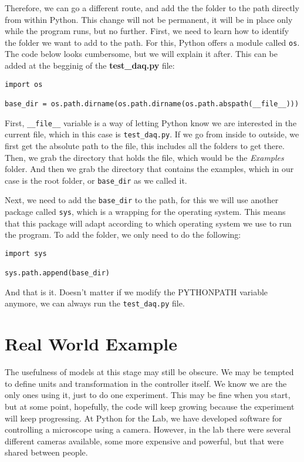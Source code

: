 Therefore, we can go a different route, and add the the folder to the path directly from within Python. This change will not be permanent, it will be in place only while the program runs, but no further. First, we need to learn how to identify the folder we want to add to the path. For this, Python offers a module called \texttt{os}. The code below looks cumbersome, but we will explain it after. This can be added at the begginig of the \textbf{test\_daq.py} file:

\begin{verbatim}
import os

base_dir = os.path.dirname(os.path.dirname(os.path.abspath(__file__)))
\end{verbatim}

First, \texttt{\_\_file\_\_} variable is a way of letting Python know we are interested in the current file, which in this case is \texttt{test\_daq.py}. If we go from inside to outside, we first get the absolute path to the file, this includes all the folders to get there. Then, we grab the directory that holds the file, which would be the \emph{Examples} folder. And then we grab the directory that contains the examples, which in our case is the root folder, or \texttt{base\_dir} as we called it.

Next, we need to add the \texttt{base\_dir} to the path, for this we will use another package called \texttt{sys}, which is a wrapping for the operating system. This means that this package will adapt according to which operating system we use to run the program. To add the folder, we only need to do the following:

\begin{verbatim}
import sys

sys.path.append(base_dir)
\end{verbatim}

And that is it. Doesn't matter if we modify the PYTHONPATH variable anymore, we can always run the \texttt{test\_daq.py} file.


\section{Real World Example}\label{section:real-world-model}
The usefulness of models at this stage may still be obscure. We may be tempted to define units and transformation in the controller itself. We know we are the only ones using it, just to do one experiment. This may be fine when you start, but at some point, hopefully, the code will keep growing because the experiment will keep progressing. At Python for the Lab, we have developed software for controlling a microscope using a camera. However, in the lab there were several different cameras available, some more expensive and powerful, but that were shared between people.

